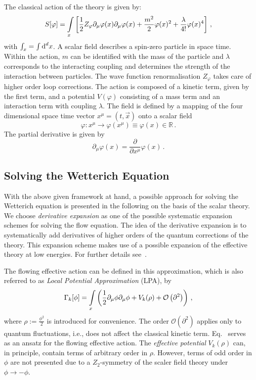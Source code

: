\documentclass[paper=a4,11pt,bibliography=totoc]{scrartcl}
\def\eq#1{\textcolor{red!50!black}{Eq.}~\labelcref{#1}}
\begin{document}
The classical action of the theory is given by:
%
\begin{equation}
\label{eq:scalartheory}
S[\varphi]=\int\displaylimits_x \left[\frac12 Z_\varphi \partial_\mu \varphi(x)\partial_\mu \varphi(x) + \frac{m^2}{2}\varphi(x)^2 + \frac{\lambda}{4!}\varphi(x)^4\right]\,,
\end{equation}
%
with $\int\displaylimits_x = \int \textnormal{d}^dx$. A scalar field describes a spin-zero particle in space time. Within the action, $m$ can be identified with the mass of the particle and $\lambda$ corresponds to the interacting coupling and determines the strength of the interaction between particles. The wave function renormalisation $Z_\varphi$ takes care of higher order loop corrections. The action is composed of a kinetic term, given by the first term, and a potential $V(\varphi)$ consisting of a mass term and an interaction term with coupling $\lambda$. The field is defined by a mapping of the four dimensional space time vector $x^\mu = (t, \vec{x})$ onto a scalar field
%
\begin{equation}
\varphi: x^\mu \rightarrow \varphi(x^\mu)\equiv \varphi(x) \in \mathbb{R}\,.
\end{equation}
%
The partial derivative is given by
%
\begin{equation}
\partial_\mu \varphi(x) = \frac{\partial}{\partial x^\mu} \varphi(x)\,.
\end{equation}

\subsection{Solving the Wetterich Equation}

With the above given framework at hand, a possible approach for solving the Wetterich equation is presented in the following on the basis of the scalar theory. We choose \textit{derivative expansion} as one of the possible systematic expansion schemes for solving the flow equation. The idea of the derivative expansion is to systematically add derivatives of higher orders of the quantum corrections of the theory. This expansion scheme makes use of a possible expansion of the effective theory at low energies. For further details see~\cite{Pawlowski2018}.

The flowing effective action can be defined in this approximation, which is also referred to as \textit{Local Potential Approximation} (LPA), by
%
\begin{equation}
\label{eq:lpa}
\Gamma_k[\phi]=\int\displaylimits_x \left(\frac{1}{2}\partial_\mu \phi \partial_\mu \phi + V_k(\rho) + \mathcal{O}\left(\partial^2\right)\right)\,,
\end{equation}
%
where $\rho:=\frac{\phi^2}{2}$ is introduced for convenience. The order $\mathcal{O}\left(\partial^2\right)$ applies only to quantum fluctuations, i.e., does not affect the classical kinetic term. \eq{eq:lpa} serves as an ansatz for the flowing effective action. The \textit{effective potential} $V_k(\rho)$ can, in principle, contain terms of arbitrary order in $\rho$. However, terms of odd order in $\phi$ are not presented due to a $Z_2$-symmetry of the scaler field theory under $\phi\to-\phi$.
\end{document}
